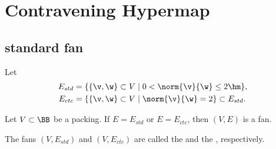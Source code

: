 
\figHBMVLMY %

%

\section{Contravening Hypermap}

\subsection{standard fan}

Let
\begin{align}\label{eqn:fan-edge}
E_{std} &= \{\{\v,\w\}\subset V\mid 0 < \norm{\v}{\w}\le 2\hm \},\\
E_{ctc} &= \{ \{\v,\w\}\subset V\mid \norm{\v}{\w}= 2 \}\subset E_{std}.
\end{align}

\begin{lemma}[]\label{lemma:ctc-fan}
Let $V\subset \BB$ be a packing.  If $E=E_{std}$ or $E=E_{ctc}$, then
$(V,E)$ is a fan.
\end{lemma}

\begin{definition}
The fans $(V,E_{std})$ and $(V,E_{ctc})$ are called the  and
the , respectively.  
\end{definition}
%
%
%
%
%
%
%

